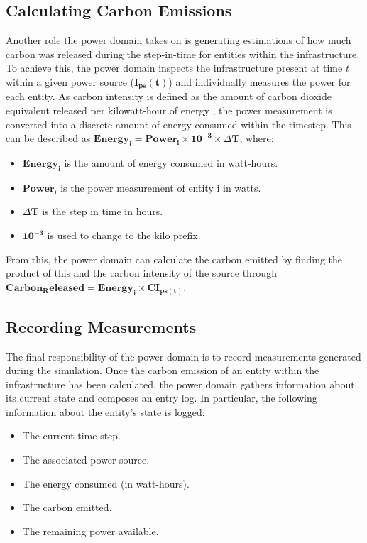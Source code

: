 \documentclass{l4proj}
\begin{document}
\subsection{Calculating Carbon Emissions}\label{subsec:carbon-released}
Another role the power domain takes on is generating estimations of how much carbon was released during the step-in-time for entities within the infrastructure.
To achieve this, the power domain inspects the infrastructure present at time $t$ within a given power source ($\mathbf{I_{ps}(t)}$) and individually measures the power for each entity.
As carbon intensity is defined as the amount of carbon dioxide equivalent released per kilowatt-hour of energy \citep{owid-electricity-mix}, the power measurement is converted into a discrete amount of energy consumed within the timestep.
This can be described as $\mathbf{Energy_{i}} = \mathbf{Power_{i}} \times \mathbf{10^{-3}} \times \mathbf{\varDelta T}$, where:
\begin{itemize}
    \item $\mathbf{Energy_{i}}$ is the amount of energy consumed in watt-hours.
    \item $\mathbf{Power_{i}}$ is the power measurement of entity i in watts.
    \item $\mathbf{\varDelta T}$ is the step in time in hours.
    \item $\mathbf{10^{-3}}$ is used to change to the kilo prefix.
\end{itemize}
From this, the power domain can calculate the carbon emitted by finding the product of this and the carbon intensity of the source through $\mathbf{Carbon_Released = Energy_{i} \times CI_{ps(t)}}$.

\subsection{Recording Measurements}\label{subsec:power-domain-recording-measurements}
The final responsibility of the power domain is to record measurements generated during the simulation.
Once the carbon emission of an entity within the infrastructure has been calculated, the power domain gathers information about its current state and composes an entry log.
In particular, the following information about the entity's state is logged:
\begin{itemize}
    \item The current time step.
    \item The associated power source.
    \item The energy consumed (in watt-hours).
    \item The carbon emitted.
    \item The remaining power available.
\end{itemize}
\end{document}
